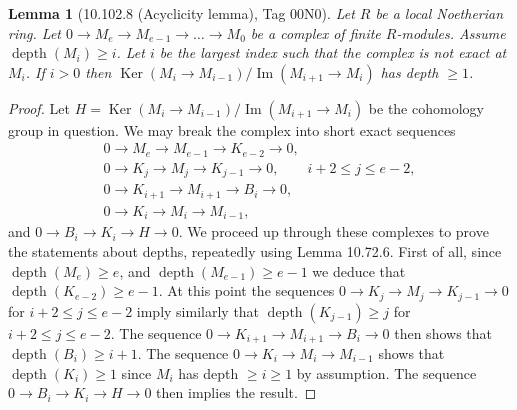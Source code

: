 \documentclass[UTF8,11pt]{ctexart}
\newtheorem*{lemma}{Lemma}
\begin{document}
\begin{lemma}[10.102.8 (Acyclicity lemma), Tag 00N0]
Let $R$ be a local Noetherian ring. Let $0\to M_e\to M_{e-1}\to\ldots\to M_0$ be a complex of finite $R$-modules. Assume $\operatorname{depth}(M_i)\geq i$. Let $i$ be the largest index such that the complex is not exact at $M_i$. If $i>0$ then $\operatorname{Ker}(M_i\to M_{i-1})/\operatorname{Im}(M_{i+1}\to M_i)$ has depth $\geq1$.
\end{lemma}
\begin{proof}
Let $H=\operatorname{Ker}(M_i\to M_{i-1})/\operatorname{Im}(M_{i+1}\to M_i)$ be the cohomology group in question. We may break the complex into short exact sequences
\[
\begin{gathered}
0\to M_e\to M_{e-1}\to K_{e-2}\to0,\\
0\to K_j\to M_j\to K_{j-1}\to0,\qquad i+2\leq j\leq e-2,\\
0\to K_{i+1}\to M_{i+1}\to B_i\to0,\\
0\to K_i\to M_i\to M_{i-1},
\end{gathered}
\]
and $0\to B_i\to K_i\to H\to0$. We proceed up through these complexes to prove the statements about depths, repeatedly using Lemma 10.72.6. First of all, since $\operatorname{depth}(M_e)\geq e$, and $\operatorname{depth}(M_{e-1})\geq e-1$ we deduce that $\operatorname{depth}(K_{e-2})\geq e-1$. At this point the sequences $0\to K_j\to M_j\to K_{j-1}\to0$ for $i+2\leq j\leq e-2$ imply similarly that $\operatorname{depth}(K_{j-1})\geq j$ for $i+2\leq j\leq e-2$. The sequence $0\to K_{i+1}\to M_{i+1}\to B_i\to0$ then shows that $\operatorname{depth}(B_i)\geq i+1$. The sequence $0\to K_i\to M_i\to M_{i-1}$ shows that $\operatorname{depth}(K_i)\geq1$ since $M_i$ has depth $\geq i\geq1$ by assumption. The sequence $0\to B_i\to K_i\to H\to0$ then implies the result.
\end{proof}
\end{document}
